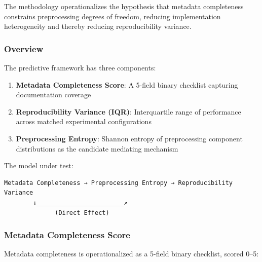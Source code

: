 
The methodology operationalizes the hypothesis that metadata completeness constrains preprocessing degrees of freedom, reducing implementation heterogeneity and thereby reducing reproducibility variance.

\subsubsection{Overview}

The predictive framework has three components:

\begin{enumerate}
\item \textbf{Metadata Completeness Score}: A 5-field binary checklist capturing documentation coverage
\item \textbf{Reproducibility Variance (IQR)}: Interquartile range of performance across matched experimental configurations
\item \textbf{Preprocessing Entropy}: Shannon entropy of preprocessing component distributions as the candidate mediating mechanism
\end{enumerate}

The model under test:

\begin{verbatim}
Metadata Completeness → Preprocessing Entropy → Reproducibility Variance
        ↓________________________↗
              (Direct Effect)
\end{verbatim}

\subsubsection{Metadata Completeness Score}

Metadata completeness is operationalized as a 5-field binary checklist, scored 0--5:

\begin{table}[htbp]
\centering
{}
\end{table}

